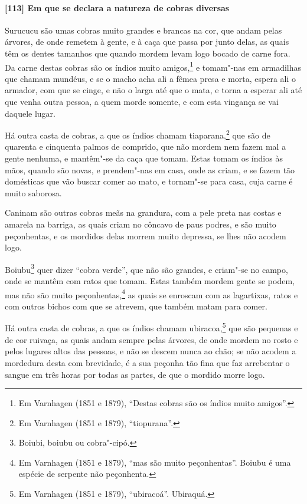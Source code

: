 \begin{linenumbers}
\paragraph{[113] Em que se declara a natureza de cobras diversas}\quad
Surucucu são umas cobras muito grandes e brancas na cor, que andam pelas árvores, de onde
remetem à gente, e à caça que passa por junto delas, as quais têm os dentes tamanhos que
quando mordem levam logo bocado de carne fora. Da carne destas cobras são os índios muito
amigos,\footnote{ Em Varnhagen (1851 e 1879), ``Destas cobras são os índios muito
amigos''.} e tomam"-nas em armadilhas que chamam mundéus, e se o macho acha ali a fêmea
presa e morta, espera ali o armador, com que se cinge, e não o larga até que o mata, e
torna a esperar ali até que venha outra pessoa, a quem morde somente, e com esta vingança
se vai daquele lugar.

Há outra casta de cobras, a que os índios chamam tiaparana,\footnote{ Em Varnhagen (1851 e
1879), ``tiopurana''.} que são de quarenta e cinquenta palmos de comprido, que não mordem
nem fazem mal a gente nenhuma, e mantêm"-se da caça que tomam. Estas tomam os índios às
mãos, quando são novas, e prendem"-nas em casa, onde as criam, e se fazem tão domésticas
que vão buscar comer ao mato, e tornam"-se para casa, cuja carne é muito saborosa.

Caninam são outras cobras meãs na grandura, com a pele preta nas costas e amarela na
barriga, as quais criam no côncavo de paus podres, e são muito peçonhentas, e os mordidos
delas morrem muito depressa, se lhes não acodem logo.

Boiubu\footnote{ Boiubi, boiubu ou cobra"-cipó.} quer dizer ``cobra verde'', que não são
grandes, e criam"-se no campo, onde se mantêm com ratos que tomam. Estas também mordem
gente se podem, mas não são muito peçonhentas,\footnote{ Em Varnhagen (1851 e 1879), ``mas
são muito peçonhentas''. Boiubu é uma espécie de serpente não peçonhenta.} as quais se
enroscam com as lagartixas, ratos e com outros bichos com que se atrevem, que também matam
para comer.

Há outra casta de cobras, a que os índios chamam ubiracoa,\footnote{ Em Varnhagen (1851 e
1879), ``ubiracoá''. Ubiraquá.} que são pequenas e de cor ruivaça, as quais andam sempre
pelas árvores, de onde mordem no rosto e pelos lugares altos das pessoas, e não se descem
nunca ao chão; se não acodem a mordedura desta com brevidade, é a sua peçonha tão fina que
faz arrebentar o sangue em três horas por todas as partes, de que o mordido morre logo.


\end{linenumbers}
